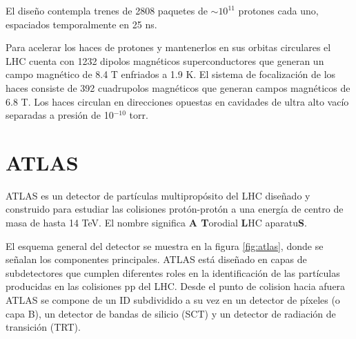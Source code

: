 El diseño contempla trenes de 2808 paquetes de $\sim 10^{11}$ protones cada uno,
espaciados temporalmente en 25 ns.

Para acelerar los haces de protones y mantenerlos en sus orbitas circulares el LHC cuenta con 1232
dipolos magnéticos superconductores que generan un campo magnético de 8.4 T enfriados a 1.9 K.
El sistema de focalización de los haces consiste de 392 cuadrupolos magnéticos que generan campos
magnéticos de 6.8 T. Los haces circulan en direcciones opuestas en cavidades de ultra alto vacío
separadas a presión de 10$^{-10}$ torr.


\section{ATLAS}

ATLAS es un detector de partículas multipropósito del LHC diseñado y construido para estudiar
las colisiones protón-protón a una energía de centro de masa de hasta 14 TeV.
El nombre significa \textbf{A T}orodial \textbf{L}HC aparatu\textbf{S}.




El esquema general del detector se muestra en la figura \ref{fig:atlas}, donde se señalan los
componentes principales.
ATLAS está diseñado en capas de subdetectores que cumplen diferentes roles en la identificación
de las partículas producidas en las colisiones pp del LHC.
Desde el punto de colision hacia afuera ATLAS se compone de un ID subdividido a su vez en un
detector de píxeles (o capa B), un detector de bandas de silicio (SCT) y un detector de radiación
de transición (TRT).

